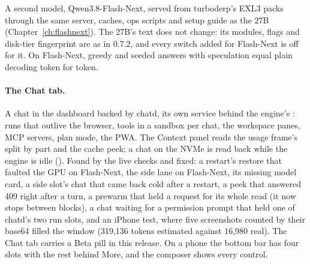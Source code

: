 A second model, Qwen3.8-Flash-Next, served from turboderp's EXL3 packs through the same server, caches, ops scripts and setup guide as the 27B (Chapter~\ref{ch:flashnext}). The 27B's text does not change: its modules, flags and disk-tier fingerprint are as in 0.7.2, and every switch added for Flash-Next is off for it. On Flash-Next, greedy and seeded answers with speculation equal plain decoding token for token.

\paragraph{The Chat tab.} A chat in the dashboard backed by chatd, its own service behind the engine's : runs that outlive the browser, tools in a sandbox per chat, the workspace panes, MCP servers, plan mode, the PWA. The Context panel reads the usage frame's split by part and the cache peek; a chat on the NVMe is read back while the engine is idle (). Found by the live checks and fixed: a restart's restore that faulted the GPU on Flash-Next, the side lane on Flash-Next, its missing model card, a side slot's chat that came back cold after a restart, a peek that answered 409 right after a turn, a prewarm that held a request for its whole read (it now stops between blocks), a chat waiting for a permission prompt that held one of chatd's two run slots, and an iPhone test, where five screenshots counted by their base64 filled the window (319,136 tokens estimated against 16,980 real). The Chat tab carries a Beta pill in this release. On a phone the bottom bar has four slots with the rest behind More, and the composer shows every control.

